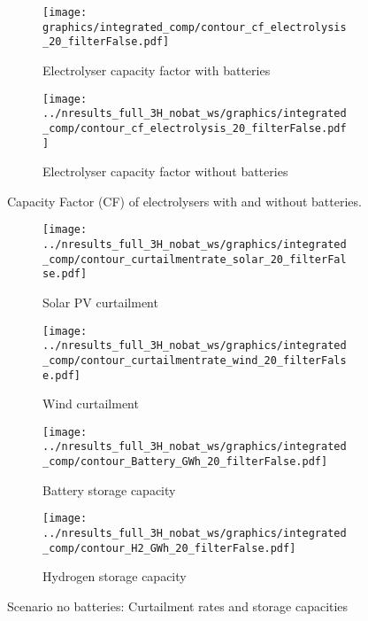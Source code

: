\begin{figure*}[h] 
    \centering
    \begin{subfigure}[b]{0.45\linewidth}
        \centering
        \texttt{[image: graphics/integrated\_comp/contour\_cf\_electrolysis\_20\_filterFalse.pdf]}
        \caption{Electrolyser capacity factor with batteries}
        \label{fig:ely_cf}
    \end{subfigure}
    \hfill
    \begin{subfigure}[b]{0.45\linewidth}
        \centering
        \texttt{[image: ../nresults\_full\_3H\_nobat\_ws/graphics/integrated\_comp/contour\_cf\_electrolysis\_20\_filterFalse.pdf]}
        \caption{Electrolyser capacity factor without batteries}
        \label{fig:ely_cf_nobat}
    \end{subfigure}
    \hfill

    \caption{Capacity Factor (CF) of electrolysers with and without batteries.}
    \label{fig:cf_ely_sens}
\end{figure*}



\begin{figure*}[h] %
    \centering
    \begin{subfigure}[b]{0.45\linewidth}
        \centering
        \texttt{[image: ../nresults\_full\_3H\_nobat\_ws/graphics/integrated\_comp/contour\_curtailmentrate\_solar\_20\_filterFalse.pdf]}
        \caption{Solar PV curtailment}
        \label{fig:solar_curt}
    \end{subfigure}
    \hfill
    \begin{subfigure}[b]{0.45\linewidth}
        \centering
        \texttt{[image: ../nresults\_full\_3H\_nobat\_ws/graphics/integrated\_comp/contour\_curtailmentrate\_wind\_20\_filterFalse.pdf]}
        \caption{Wind curtailment}
        \label{fig:wind_curt}
    \end{subfigure}
    \hfill
    \begin{subfigure}[b]{0.45\linewidth}
        \centering
        \texttt{[image: ../nresults\_full\_3H\_nobat\_ws/graphics/integrated\_comp/contour\_Battery\_GWh\_20\_filterFalse.pdf]}
        \caption{Battery storage capacity}
        \label{fig:battery_cap}
    \end{subfigure}
    \hfill
    \begin{subfigure}[b]{0.45\linewidth}
        \centering
        \texttt{[image: ../nresults\_full\_3H\_nobat\_ws/graphics/integrated\_comp/contour\_H2\_GWh\_20\_filterFalse.pdf]}
        \caption{Hydrogen storage capacity}
        \label{fig:hystorage_cap}
    \end{subfigure}
    \hfill

    \caption{Scenario no batteries: Curtailment rates and storage capacities}
    \label{fig:integration_options_nobat}
\end{figure*}